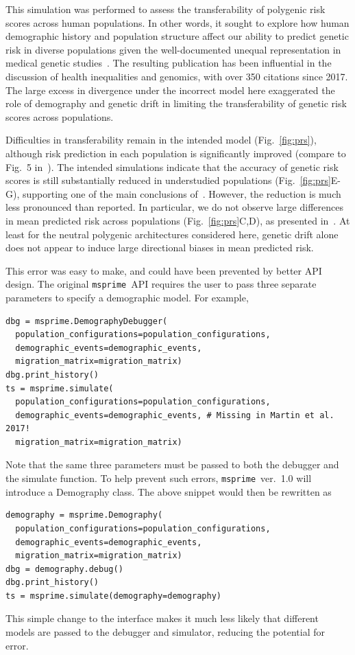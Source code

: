 \documentclass{article}
\newcommand{\msprime}[0]{\texttt{msprime}}
\begin{document}
This simulation was performed to assess the
transferability of polygenic risk scores across human populations. In other words, it sought to
explore how human demographic history and population structure affect our ability
to predict genetic risk in diverse populations given the well-documented unequal representation
in medical genetic studies~\citep{popejoy2016genomics}. The resulting publication has been
influential in the discussion of health inequalities and genomics, with over 350 citations since 2017.
The large excess in divergence under the incorrect model here exaggerated the role of demography
and genetic drift in limiting the transferability of genetic risk scores across populations.

Difficulties in transferability remain in the intended model (Fig.~\ref{fig:prs}), although
risk prediction in each population is significantly improved (compare to Fig.~5 in~\citet{martin2017human}).
The intended simulations indicate that the accuracy of genetic risk scores is still
substantially reduced in understudied populations (Fig.~\ref{fig:prs}E-G),
supporting one of the main conclusions of~\citet{martin2017human}.
However, the reduction is much less pronounced than reported.
In particular, we do not observe large differences in mean predicted risk 
across populations (Fig.~\ref{fig:prs}C,D), as presented in~\citet{martin2017human}.
At least for the neutral polygenic architectures considered here, genetic drift alone
does not appear to induce large directional biases in mean predicted risk.

This error was easy to make, and could have been prevented by better API design.
The original \msprime\ API requires the user to pass
three separate parameters to specify a demographic model. For example,
\begin{lstlisting}[frame=single]
dbg = msprime.DemographyDebugger(
  population_configurations=population_configurations,
  demographic_events=demographic_events,
  migration_matrix=migration_matrix)
dbg.print_history()
ts = msprime.simulate(
  population_configurations=population_configurations,
  demographic_events=demographic_events, # Missing in Martin et al. 2017!
  migration_matrix=migration_matrix)
\end{lstlisting}
Note that the same three parameters must be passed to both the debugger
and the simulate function.
To help prevent such errors,
\msprime~ver.~1.0 will introduce a Demography class. The above
snippet would then be rewritten as
\begin{lstlisting}[frame=single]
demography = msprime.Demography(
  population_configurations=population_configurations,
  demographic_events=demographic_events,
  migration_matrix=migration_matrix)
dbg = demography.debug()
dbg.print_history()
ts = msprime.simulate(demography=demography)
\end{lstlisting}
This simple change to the interface makes it much less likely
that different models are passed to the debugger and simulator,
reducing the potential for error.
\end{document}
